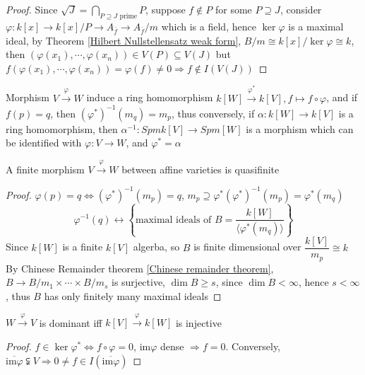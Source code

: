 \documentclass[main]{subfiles}
\begin{document}
\begin{proof}
Since $\displaystyle \sqrt{J}=\bigcap_{P\supseteq J \text{ prime}}P$, suppose $f\notin P$ for some $P\supseteq J$, consider $\varphi:k[x]\to k[x]/P\to A_{\overline f}\to A_{\overline f}/m$ which is a field, hence $\ker\varphi$ is a maximal ideal, by Theorem \ref{Hilbert Nullstellensatz weak form}, $B/m\cong k[x]/\ker\varphi\cong k$, then $(\varphi(x_1),\cdots,\varphi(x_n))\in V(P)\subseteq V(J)$ but $f(\varphi(x_1),\cdots,\varphi(x_n))=\varphi(f)\neq0\Rightarrow f\notin I(V(J))$
\end{proof}

\begin{proposition}
Morphism $V\xrightarrow{\varphi} W$ induce a ring homomorphism $k[W]\xrightarrow{\varphi^*} k[V],f\mapsto f\circ\varphi$, and if $f(p)=q$, then $(\varphi^*)^{-1}(m_{q})=m_p$, thus conversely, if $\alpha:k[W]\to k[V]$ is a ring homomorphism, then $\alpha^{-1}:Spmk[V]\to Spm[W]$ is a morphism which can be identified with $\varphi:V\to W$, and $\varphi^*=\alpha$
\end{proposition}

\begin{proposition}
A finite morphism $V\xrightarrow{\varphi} W$ between affine varieties is quasifinite
\end{proposition}

\begin{proof}
$\varphi(p)=q\Leftrightarrow(\varphi^*)^{-1}(m_p)=q$, $m_p\supseteq\varphi^*(\varphi^*)^{-1}(m_p)=\varphi^*(m_q)$
\[\varphi^{-1}(q)\leftrightarrow\left\{\text{maximal ideals of }B=\frac{k[W]}{\langle\varphi^*(m_q)\rangle}\right\}\]
Since $k[W]$ is a finite $k[V]$ algerba, so $B$ is finite dimensional over $\dfrac{k[V]}{m_p}\cong k$
By Chinese Remainder theorem \ref{Chinese remainder theorem}, $B\to B/m_1\times\cdots\times B/m_s$ is surjective, $\dim B\geq s$, since $\dim B<\infty$, hence $s<\infty$, thus $B$ has only finitely many maximal ideals
\end{proof}

\begin{proposition}\label{W->V dominant => k[V]->k[W] injective}
$W\xrightarrow{\varphi}V$ is dominant iff $k[V]\xrightarrow{\varphi} k[W]$ is injective
\end{proposition}

\begin{proof}
$f\in\ker\varphi^*\Leftrightarrow f\circ\varphi=0$, $\mathrm{im}\varphi$ dense $\Rightarrow f=0$. Conversely, $\overline{\mathrm{im}\varphi}\subsetneqq V\Rightarrow 0\neq f\in I(\overline{\mathrm{im}\varphi})$
\end{proof}
\end{document}
